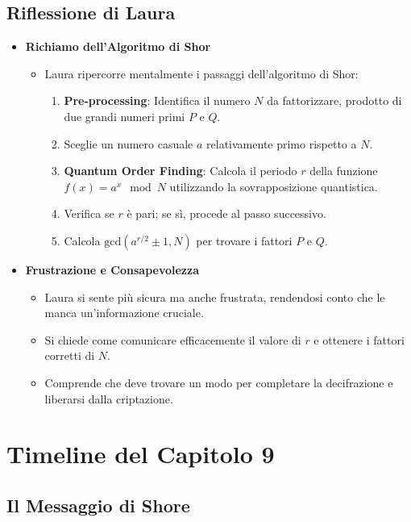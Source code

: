 \subsection*{Riflessione di Laura}

\begin{itemize}
    \item \textbf{Richiamo dell'Algoritmo di Shor}
    \begin{itemize}
        \item Laura ripercorre mentalmente i passaggi dell'algoritmo di Shor:
        \begin{enumerate}
            \item \textbf{Pre-processing}: Identifica il numero \( N \) da fattorizzare, prodotto di due grandi numeri primi \( P \) e \( Q \).
            \item Sceglie un numero casuale \( a \) relativamente primo rispetto a \( N \).
            \item \textbf{Quantum Order Finding}: Calcola il periodo \( r \) della funzione \( f(x) = a^x \mod N \) utilizzando la sovrapposizione quantistica.
            \item Verifica se \( r \) è pari; se sì, procede al passo successivo.
            \item Calcola \( \text{gcd}(a^{r/2} \pm 1, N) \) per trovare i fattori \( P \) e \( Q \).
        \end{enumerate}
    \end{itemize}
    \item \textbf{Frustrazione e Consapevolezza}
    \begin{itemize}
        \item Laura si sente più sicura ma anche frustrata, rendendosi conto che le manca un'informazione cruciale.
        \item Si chiede come comunicare efficacemente il valore di \( r \) e ottenere i fattori corretti di \( N \).
        \item Comprende che deve trovare un modo per completare la decifrazione e liberarsi dalla criptazione.
    \end{itemize}
\end{itemize}
\section*{Timeline del Capitolo 9}

\subsection*{Il Messaggio di Shore}

